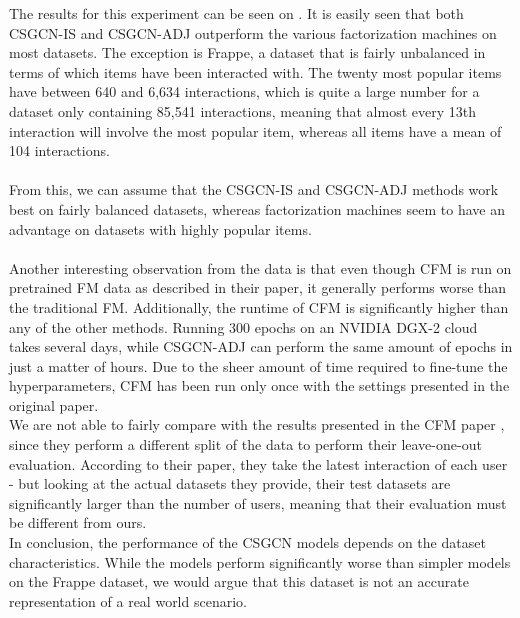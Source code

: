 The results for this experiment can be seen on .
It is easily seen that both CSGCN-IS and CSGCN-ADJ outperform the various factorization machines on most datasets.
The exception is Frappe, a dataset that is fairly unbalanced in terms of which items have been interacted with. 
The twenty most popular items have between 640 and 6,634 interactions, which is quite a large number for a dataset only containing 85,541 interactions, meaning that almost every 13th interaction will involve the most popular item, whereas all items have a mean of 104 interactions.\\\\
From this, we can assume that the CSGCN-IS and CSGCN-ADJ methods work best on fairly balanced datasets, whereas factorization machines seem to have an advantage on datasets with highly popular items.\\\\
Another interesting observation from the data is that even though CFM is run on pretrained FM data as described in their paper, it generally performs worse than the traditional FM.
Additionally, the runtime of CFM is significantly higher than any of the other methods.
Running 300 epochs on an NVIDIA DGX-2 cloud takes several days, while CSGCN-ADJ can perform the same amount of epochs in just a matter of hours.
Due to the sheer amount of time required to fine-tune the hyperparameters, CFM has been run only once with the settings presented in the original paper.\\
We are not able to fairly compare with the results presented in the CFM paper \cite{CFM}, since they perform a different split of the data to perform their leave-one-out evaluation.
According to their paper, they take the latest interaction of each user - but looking at the actual datasets they provide, their test datasets are significantly larger than the number of users, meaning that their evaluation must be different from ours.
\\
In conclusion, the performance of the CSGCN models depends on the dataset characteristics.
While the models perform significantly worse than simpler models on the Frappe dataset, we would argue that this dataset is not an accurate representation of a real world scenario.

